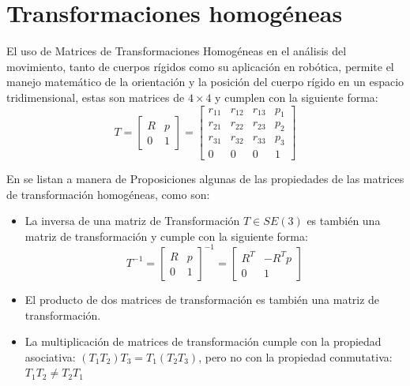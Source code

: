 \section{Transformaciones homogéneas}

El uso de Matrices de Transformaciones Homogéneas en el análisis del movimiento, tanto de cuerpos rígidos como su aplicación en robótica, permite el manejo matemático de la orientación y la posición del cuerpo rígido en un espacio tridimensional, estas son matrices de $4 \times 4$ y cumplen con la siguiente forma:\\

\begin{equation*}
	T = 
    \begin{bmatrix}
	R & p\\
	0 & 1 
	\end{bmatrix} = 
    \begin{bmatrix}
	r_{11} & r_{12} & r_{13} & p_{1}\\
	r_{21} & r_{22} & r_{23} & p_{2}\\
	r_{31} & r_{32} & r_{33} & p_{3}\\
	0 & 0 & 0 & 1 
	\end{bmatrix}
\end{equation*}

En \cite{lynch_modern_2017} se listan a manera de Proposiciones algunas de las propiedades de las matrices de transformación homogéneas, como son:\\
\begin{itemize}
    \item La inversa de una matriz de Transformación $T \in SE(3)$ es también una matriz de transformación y cumple con la siguiente forma:
    \begin{equation*}
        T^{-1} = 
    \begin{bmatrix}
	R & p\\
	0 & 1 
	\end{bmatrix}^{-1} = 
    \begin{bmatrix}
	R^{T} & -R^{T}p\\
	0 & 1 
	\end{bmatrix}
    \end{equation*}
    \item El producto de dos matrices de transformación es también una matriz de transformación.
    \item La multiplicación de matrices de transformación cumple con la propiedad asociativa: $(T_{1}T_{2})T_{3}=T_{1}(T_{2}T_{3})$, pero no con la propiedad conmutativa: $T_{1}T_{2}\neq T_{2}T_{1}$  
\end{itemize}

